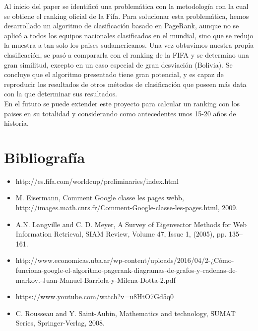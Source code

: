 \documentclass[twocolumn]{article}
\begin{document}
Al inicio del paper se identificó una problemática con la metodología con la cual se obtiene el ranking oficial de la Fifa. Para solucionar esta problemática, hemos desarrollado un algoritmo de clasificación basado en PageRank, aunque no se aplicó a todos los equipos nacionales clasificados en el mundial, sino que se redujo la muestra a tan solo los paises sudamericanos.
Una vez obtuvimos nuestra propia clasificación, se pasó a compararla con el ranking de la FIFA y se determino una gran similitud, excepto en un caso especial de gran desviación (Bolivia).
Se concluye que el algoritmo presentado tiene gran potencial, y es capaz de reproducir los resultados de otros métodos de clasificación que poseen más data con la que determinar sus resultados. \\
En el futuro se puede extender este proyecto para calcular un ranking con los paises en su totalidad y considerando como antecedentes unos 15-20 años de historia.


\section{Bibliografía}
\begin{itemize}
\item http://es.fifa.com/worldcup/preliminaries/index.html
\item 
M. Eisermann, Comment Google classe les pages webb,
http://images.math.cnrs.fr/Comment-Google-classe-les-pages.html, 2009.
\item 
A.N. Langville and C. D. Meyer, A Survey of Eigenvector Methods
for Web Information Retrieval, SIAM Review, Volume 47, Issue 1,
(2005), pp. 135–161.
\item
http://www.economicas.uba.ar/wp-content/uploads/2016/04/2-¿Cómo-funciona-google-el-algoritmo-pagerank-diagramas-de-grafos-y-cadenas-de-markov.-Juan-Manuel-Barriola-y-Milena-Dotta-2.pdf
\item
https://www.youtube.com/watch?v=u8HtO7Gd5q0
\item
C. Rousseau and Y. Saint-Aubin, Mathematics and
technology, SUMAT Series, Springer-Verlag, 2008.
\end{itemize}
\end{document}
